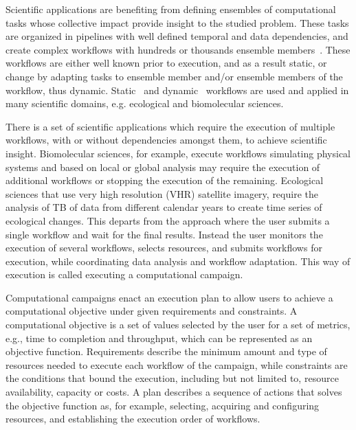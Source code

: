 Scientific applications are benefiting from defining ensembles of computational tasks whose collective impact provide insight to the studied problem. These tasks are organized in pipelines with well defined temporal and data dependencies, and create complex workflows with hundreds or thousands ensemble members~\cite{malawski2015algorithms,rietmann2012forward,dakka2018high}. These workflows are either well known prior to execution, and as a result static, or change by adapting tasks to ensemble member and/or ensemble members of the workflow, thus dynamic. Static~\cite{paraskevakos2019workflow} and dynamic~\cite{dakka2018high} workflows are used and applied in many scientific domains, e.g. ecological and biomolecular sciences. 

There is a set of scientific applications which require the execution of multiple workflows, with or without dependencies amongst them, to achieve scientific insight. Biomolecular sciences, for example, execute workflows simulating physical systems and based on local or global analysis may require the execution of additional workflows or stopping the execution of the remaining. Ecological sciences that use very high resolution (VHR) satellite imagery, require the analysis of TB of data from different calendar years to create time series of ecological changes. This departs from the approach where the user submits a single workflow and wait for the final results. Instead the user monitors the execution of several workflows, selects resources, and submits workflows for execution, while coordinating data analysis and workflow adaptation. This way of execution is called executing a computational campaign.

Computational campaigns enact an execution plan to allow users to achieve a computational objective under given requirements and constraints. A computational objective is a set of values selected by the user for a set of metrics, e.g., time to completion and throughput, which can be represented as an objective function. Requirements describe the minimum amount and type of resources needed to execute each workflow of the campaign, while constraints are the conditions that bound the execution, including but not limited to, resource availability, capacity or costs. A plan describes a sequence of actions that solves the objective function as, for example, selecting, acquiring and configuring resources, and establishing the execution order of workflows.

